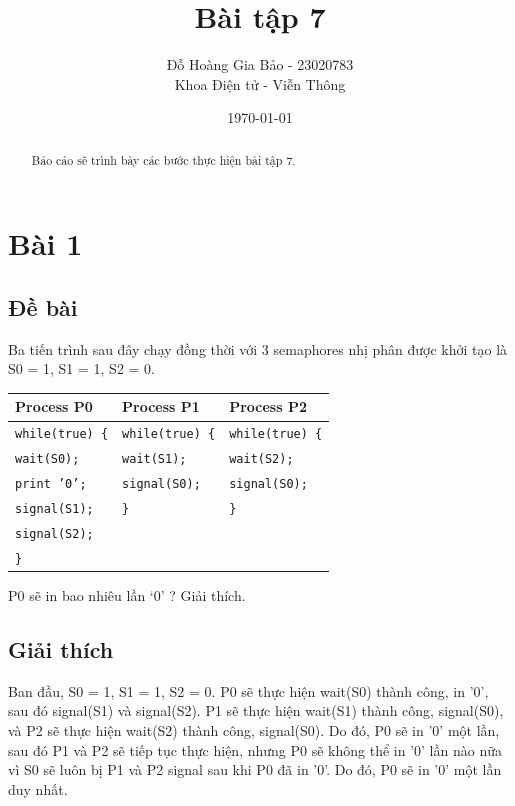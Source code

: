 \documentclass[12pt, letterpaper]{article}
\title{Bài tập 7}
\author{Đỗ Hoàng Gia Bảo - 23020783 \\ \small Khoa Điện tử - Viễn Thông}
\date{\today}
\begin{document}
\maketitle

\begin{abstract}
\centering
Báo cáo sẽ trình bày các bước thực hiện bài tập 7.
\end{abstract}
\newpage
\tableofcontents

\newpage
{}
\setcounter{page}{3} %

\section{Bài 1}
\subsection{Đề bài}
Ba tiến trình sau đây chạy đồng thời với 3 semaphores nhị phân được khởi tạo là S0 = 1, S1 = 1, S2 = 0.
\begin{table}[H]
\centering
\begin{tabularx}{\textwidth}{|X|X|X|}
\hline
\textbf{Process P0} & \textbf{Process P1} & \textbf{Process P2} \\ \hline
\texttt{while(true) \{} & \texttt{while(true) \{} & \texttt{while(true) \{} \\
\texttt{\quad wait(S0);} & \texttt{\quad wait(S1);} & \texttt{\quad wait(S2);} \\
\texttt{\quad print '0';} & \texttt{\quad signal(S0);} & \texttt{\quad signal(S0);} \\
\texttt{\quad signal(S1);} & \texttt{\}} & \texttt{\}} \\
\texttt{\quad signal(S2);} & & \\
\texttt{\}} & & \\ \hline
\end{tabularx}
\end{table}
\noindent P0 sẽ in bao nhiêu lần ‘0’ ? Giải thích.
\subsection{Giải thích}
Ban đầu, S0 = 1, S1 = 1, S2 = 0. P0 sẽ thực hiện wait(S0) thành công, in '0', sau đó signal(S1) và signal(S2). P1 sẽ thực hiện wait(S1) thành công, signal(S0), và P2 sẽ thực hiện wait(S2) thành công, signal(S0). Do đó, P0 sẽ in '0' một lần, sau đó P1 và P2 sẽ tiếp tục thực hiện, nhưng P0 sẽ không thể in '0' lần nào nữa vì S0 sẽ luôn bị P1 và P2 signal sau khi P0 đã in '0'. Do đó, P0 sẽ in '0' một lần duy nhất.
\end{document}
